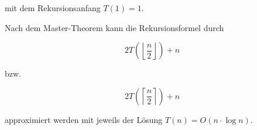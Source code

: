 \documentclass{lehramt-informatik-aufgabe}
\begin{document}
\begin{enumerate}
\begin{liAntwort}
mit dem Rekursionsanfang $T(1) = 1$.

Nach dem Master-Theorem kann die Rekursionsformel durch

\begin{displaymath}
2T\left(\left\lfloor\frac{n}{2}\right\rfloor\right) + n
\end{displaymath}

bzw.

\begin{displaymath}
2T\left(\left\lceil\frac{n}{2}\right\rceil\right) + n
\end{displaymath}

approximiert werden mit jeweils der Lösung $T(n) = O(n \cdot \log n)$.
\end{liAntwort}

\end{enumerate}
\end{document}
